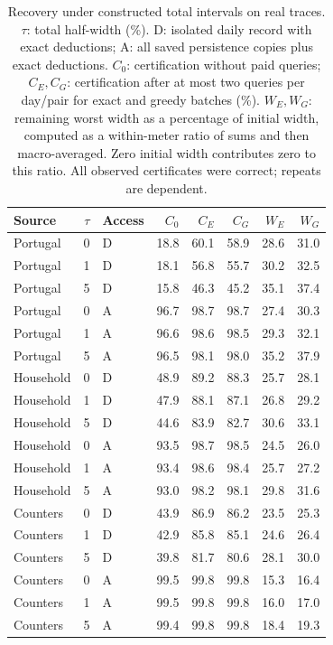 \documentclass[12pt]{article}
\begin{document}
\begin{table}[htbp]
\centering\normalsize\setlength{\tabcolsep}{4pt}
\caption{Recovery under constructed total intervals on real traces. $\tau$: total half-width (\%). D: isolated daily record with exact deductions; A: all saved persistence copies plus exact deductions. $C_0$: certification without paid queries; $C_E,C_G$: certification after at most two queries per day/pair for exact and greedy batches (\%). $W_E,W_G$: remaining worst width as a percentage of initial width, computed as a within-meter ratio of sums and then macro-averaged. Zero initial width contributes zero to this ratio. All observed certificates were correct; repeats are dependent.}
\label{tab:interval-trace-recovery}
\begin{tabular}{lrlrrrrr}
\toprule
Source & $\tau$ & Access & $C_0$ & $C_E$ & $C_G$ & $W_E$ & $W_G$\\
\midrule
Portugal & 0 & D & 18.8 & 60.1 & 58.9 & 28.6 & 31.0\\
Portugal & 1 & D & 18.1 & 56.8 & 55.7 & 30.2 & 32.5\\
Portugal & 5 & D & 15.8 & 46.3 & 45.2 & 35.1 & 37.4\\
Portugal & 0 & A & 96.7 & 98.7 & 98.7 & 27.4 & 30.3\\
Portugal & 1 & A & 96.6 & 98.6 & 98.5 & 29.3 & 32.1\\
Portugal & 5 & A & 96.5 & 98.1 & 98.0 & 35.2 & 37.9\\
Household & 0 & D & 48.9 & 89.2 & 88.3 & 25.7 & 28.1\\
Household & 1 & D & 47.9 & 88.1 & 87.1 & 26.8 & 29.2\\
Household & 5 & D & 44.6 & 83.9 & 82.7 & 30.6 & 33.1\\
Household & 0 & A & 93.5 & 98.7 & 98.5 & 24.5 & 26.0\\
Household & 1 & A & 93.4 & 98.6 & 98.4 & 25.7 & 27.2\\
Household & 5 & A & 93.0 & 98.2 & 98.1 & 29.8 & 31.6\\
Counters & 0 & D & 43.9 & 86.9 & 86.2 & 23.5 & 25.3\\
Counters & 1 & D & 42.9 & 85.8 & 85.1 & 24.6 & 26.4\\
Counters & 5 & D & 39.8 & 81.7 & 80.6 & 28.1 & 30.0\\
Counters & 0 & A & 99.5 & 99.8 & 99.8 & 15.3 & 16.4\\
Counters & 1 & A & 99.5 & 99.8 & 99.8 & 16.0 & 17.0\\
Counters & 5 & A & 99.4 & 99.8 & 99.8 & 18.4 & 19.3\\
\bottomrule
\end{tabular}
\end{table}
\end{document}
